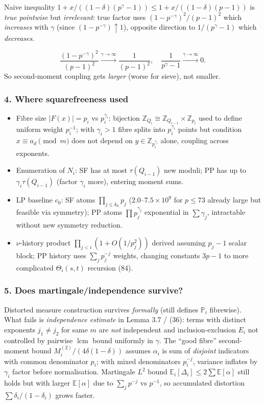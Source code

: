 \documentclass[11pt,a4paper]{article}
\theoremstyle{plain}
\theoremstyle{definition}
\theoremstyle{remark}
\newcommand{\Z}{\mathbb{Z}}
\newcommand{\PP}{\mathbb{P}}
\newcommand{\E}{\mathbb{E}}
\newcommand{\cO}{c_{0}}
\DeclareMathOperator{\lcm}{lcm}
\begin{document}
Naive inequality $1+x/((1-\delta)(p^{\gamma}-1))\le1+x/((1-\delta)(p-1))$ is \emph{true pointwise} but \emph{irrelevant}: true factor uses $(1-p^{-\gamma})^{2}/(p-1)^{2}$ which \emph{increases} with $\gamma$ (since $(1-p^{-\gamma})\uparrow1$), opposite direction to $1/(p^{\gamma}-1)$ which \emph{decreases}.

\[
\frac{(1-p^{-\gamma})^{2}}{(p-1)^{2}}\xrightarrow{\gamma\to\infty}\frac1{(p-1)^{2}},\quad\frac1{p^{\gamma}-1}\xrightarrow{\gamma\to\infty}0.
\]
So second-moment coupling gets \emph{larger} (worse for sieve), not smaller.

\subsubsection*{4. Where squarefreeness used}

\begin{itemize}
\item Fibre size $|F(x)|=p_{i}$ vs $p_{i}^{\gamma_{i}}$: bijection $\Z_{Q_{i}}\cong\Z_{Q_{i-1}}\times\Z_{p_{i}}$ used to define uniform weight $p_{i}^{-1}$; with $\gamma_{i}>1$ fibre splits into $p_{i}^{\gamma_{i}}$ points but condition $x\equiv a_{d}\pmod m$ does not depend on $y\in\Z_{p_{i}^{\gamma_{i}}}$ alone, coupling across exponents.
\item Enumeration of $N_{i}$: SF has at most $\tau(Q_{i-1})$ new moduli; PP has up to $\gamma_{i}\tau(Q_{i-1})$ (factor $\gamma_{i}$ more), entering moment sums.
\item LP baseline $\cO$: SF atoms $\prod_{j\le k_{0}}p_{j}$ ($2.0$--$7.5\times10^{9}$ for $p\le73$ already large but feasible via symmetry); PP atoms $\prod p_{j}^{\gamma_{j}}$ exponential in $\sum\gamma_{j}$, intractable without new symmetry reduction.
\item $\nu$-history product $\prod_{j<i}(1+O(1/p_{j}^{2}))$ derived assuming $p_{j}-1$ scalar block; PP history uses $\sum_{j}p_{j}^{-j}$ weights, changing constants $3p-1$ to more complicated $\Theta_{i}(s,t)$ recursion (84).
\end{itemize}

\subsubsection*{5. Does martingale/independence survive?}

Distorted measure construction survives \emph{formally} (still defines $\PP_{i}$ fibrewise). What fails is \emph{independence estimate} in Lemma 3.7 / (36): terms with distinct exponents $j_{1}\ne j_{2}$ for same $m$ are \emph{not} independent and inclusion-exclusion $E_{i}$ not controlled by pairwise $\lcm$ bound uniformly in $\gamma$. The ``good fibre'' second-moment bound $M_{i}^{(2)}/(4\delta(1-\delta))$ assumes $\alpha_{i}$ is sum of \emph{disjoint} indicators with common denominator $p_{i}$; with mixed denominators $p_{i}^{-j}$, variance inflates by $\gamma_{i}$ factor before normalisation. Martingale $L^{2}$ bound $\E_{i}[\Delta_{i}]\le2\sum\E[\alpha]$ still holds but with larger $\E[\alpha]$ due to $\sum_{j}p^{-j}$ vs $p^{-1}$, so accumulated distortion $\sum\delta_{i}/(1-\delta_{i})$ grows faster.
\end{document}
